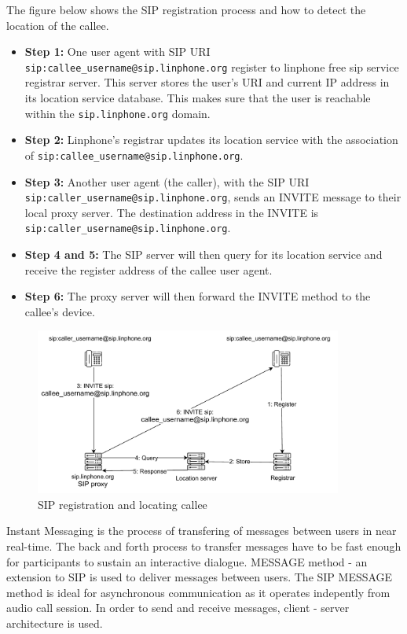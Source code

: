     \noindent The figure below shows the SIP registration process and how to detect the location of the callee. 
    \sloppy
    \begin{itemize}
        \item \textbf {Step 1:} One user agent with SIP URI \texttt{sip:callee\_username@sip.linphone.org} register to linphone free sip service registrar server. 
        This server stores the user’s URI and current IP address in its location service database. 
        This makes sure that the user is reachable within the \texttt{sip.linphone.org} domain. 
        \item \textbf {Step 2:} Linphone’s registrar updates its location service with the association of \texttt{sip:\allowbreak callee\_username@sip.linphone.org}.
        \item \textbf {Step 3:} Another user agent (the caller), with the SIP URI \texttt{\allowbreak sip:caller\_username\allowbreak @sip.linphone.org}, 
        sends an INVITE message to their local proxy server. 
        The destination address in the INVITE is \texttt{sip:caller\_username@sip.linphone.org}.
        \item \textbf {Step 4 and 5:} The SIP server will then query for its location service and receive the register address of the callee user agent.
        \item \textbf {Step 6:} The proxy server will then forward the INVITE method to the callee’s device. 
    \end{itemize}

    \begin{figure}[H]
        \centering
        \includegraphics[width=0.9\textwidth, height=0.4\textheight]{image/Locating_callee.pdf} 
        \caption{SIP registration and locating callee}
        \label{fig:locating_callee}
    \end{figure}

    Instant Messaging is the process of transfering of messages between users in near real-time.
    The back and forth process to transfer messages have to be fast enough for participants to sustain an interactive dialogue.
    MESSAGE method - an extension to SIP is used to deliver messages between users. 
    The SIP MESSAGE method is ideal for asynchronous communication as it operates indepently from audio call session.
    In order to send and receive messages, client - server architecture is used.  \\


